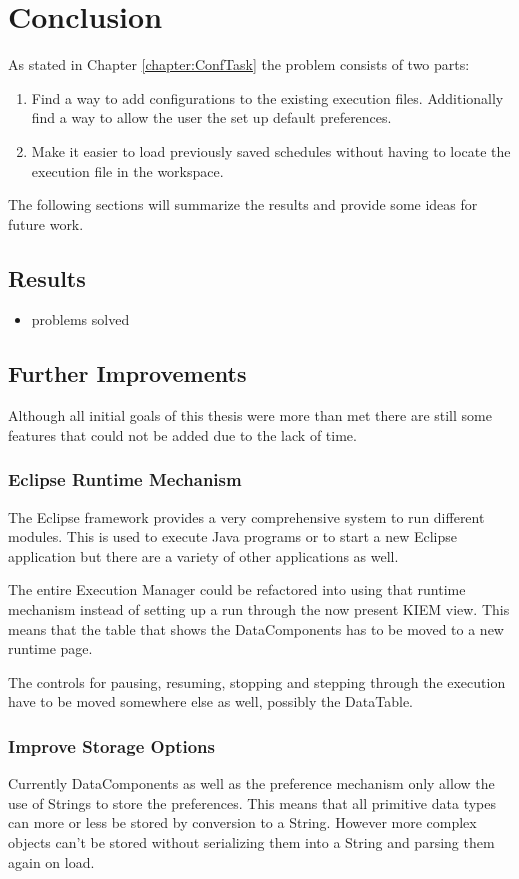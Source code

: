 \chapter{Conclusion}
\label{chapter:ConfConclusion}
As stated in Chapter \ref{chapter:ConfTask} the problem consists of two parts:
\begin{enumerate}
 \item Find a way to add configurations to the existing execution files. Additionally find
a way to allow the user the set up default preferences.
 \item Make it easier to load previously saved schedules without having to locate
the execution file in the workspace.
\end{enumerate}
The following sections will summarize the results and provide some ideas for
future work.

\section{Results}
\begin{itemize}
 \item problems solved
\end{itemize}

\section{Further Improvements}
Although all initial goals of this thesis were more than met there are still
some features that could not be added due to the lack of time.
\subsection*{Eclipse Runtime Mechanism}
The Eclipse framework provides a very comprehensive system to run different
modules. This is used to execute Java programs or to start a new Eclipse application
but there are a variety of other applications as well.

The entire Execution Manager could be refactored into using that runtime mechanism instead
of setting up a run through the now present \ac{KIEM} view. This means that the table
that shows the DataComponents has to be moved to a new runtime page. 

The controls for pausing, resuming, stopping and stepping through the execution have to
be moved somewhere else as well, possibly the DataTable.

\subsection*{Improve Storage Options}
Currently DataComponents as well as the preference mechanism only allow the use of
Strings to store the preferences. This means that all primitive data types can more
or less be stored by conversion to a String. However more complex objects can't be stored
without serializing them into a String and parsing them again on load.

